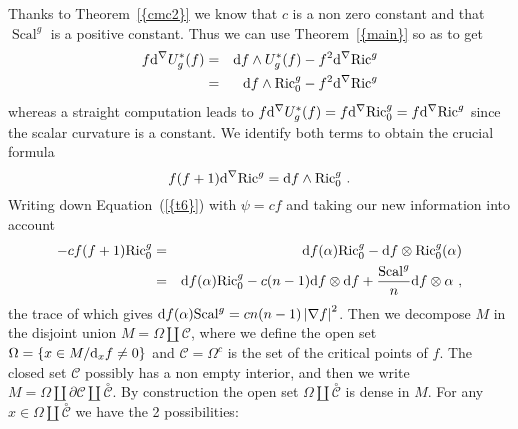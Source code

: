 \documentclass[a4paper,11pt,leqno]{amsart}
\numberwithin{equation}{section}
\theoremstyle{main}
\begin{document}
\proof Thanks to Theorem~{\ref{{cmc2}}} we know that $c$ is a non zero constant and that ${\operatorname{Scal}}^g$ is a positive constant. Thus we can use Theorem~{\ref{{main}}} so as to get
\begin{eqnarray*}
	f{{\rm d}} ^\nabla U_g^* (f) &=& {{\rm d}} f \wedge U_g^*(f) -f^2 {{\rm d}} ^\nabla{\operatorname{Ric}}^g \\
	&=&{{\rm d}} f \wedge {\operatorname{Ric}}^g_0 -f^2 {{\rm d}} ^\nabla{\operatorname{Ric}}^g 
\end{eqnarray*}
whereas a straight computation leads to $f{{\rm d}} ^\nabla U_g^* (f)= f {{\rm d}} ^\nabla {\operatorname{Ric}}^g_0= f {{\rm d}} ^\nabla {\operatorname{Ric}}^g $ since the scalar curvature is a constant. We identify both terms to obtain the crucial formula
$$ f(f+1) {{\rm d}} ^\nabla{\operatorname{Ric}}^g = {{\rm d}} f \wedge{\operatorname{Ric}}^g_0 \ .$$
Writing down Equation~({\ref{{t6}}}) with $\psi =cf$ and taking our new information into account 
\begin{eqnarray*}
	-cf(f+1){\operatorname{Ric}}_0^g &=& {{\rm d}} f(\alpha) {\operatorname{Ric}}^g_0 - {{\rm d}} f \otimes {\operatorname{Ric}}^g_0 (\alpha) \\
	&=& {{\rm d}} f(\alpha) {\operatorname{Ric}}^g_0 -c(n-1){{\rm d}} f\otimes{{\rm d}} f + \frac{{\operatorname{Scal}}^g}{n}{{\rm d}} f\otimes \alpha  \ ,
\end{eqnarray*}
the trace of which gives ${{\rm d}} f(\alpha){\operatorname{Scal}}^g=c n(n-1)\left|\nabla f\right|^2$. Then we decompose $M$ in the disjoint union $M=\Omega\coprod \mathcal{C}$, where we define the open set $\Omega=\left\{x\in M/ {{\rm d}}_x f\neq 0\right\}$ and $\mathcal{C}=\Omega^c$ is the set of the critical points of $f$. The closed set $\mathcal{C}$ possibly has a non empty interior, and then we write  $M=\Omega\coprod \partial\mathcal{C}\coprod \overset{\circ}{\mathcal{C}}$. By construction the open set $\Omega\coprod\overset{\circ}{\mathcal{C}}$ is dense in $M$. For any $x\in \Omega\coprod\overset{\circ}{\mathcal{C}}$ we have the 2 possibilities:
\end{document}
